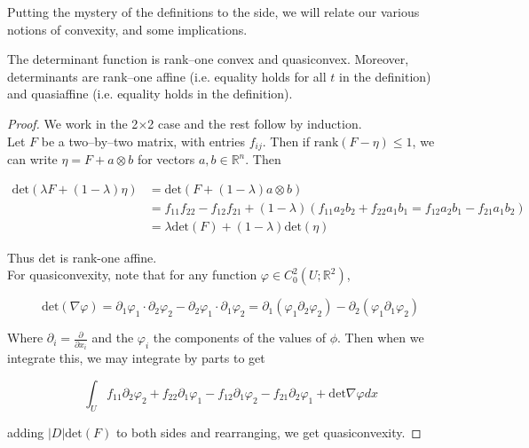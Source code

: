 \documentclass[../main.tex]{subfiles}
\begin{document}
Putting the mystery of the definitions to the side, we will relate our various notions of convexity, and some implications.

\begin{lem}
  The determinant function is rank--one convex and quasiconvex.
  Moreover, determinants are rank--one affine (i.e. equality holds for all $t$ in the definition) and quasiaffine (i.e. equality holds in the definition).
\end{lem}

\begin{proof}
  We work in the 2$\times$2 case and the rest follow by induction. \\

  Let $F$ be a two--by--two matrix, with entries $f_{ij}$.
  Then if $\mathrm{rank}(F - \eta) \leq 1$, we can write $\eta = F + a \otimes b$ for vectors $a,b \in \mathbb{R}^n$.
  Then
  
\begin{align*}
  \mathrm{det} ( \lambda F + (1- \lambda) \eta) &= \mathrm{det} ( F + (1-\lambda) a \otimes b) \\
                                 &= f_{11} f_{22} - f_{12}f_{21} + (1-\lambda) (f_{11} a_2b_2 + f_{22} a_1b_1 = f_{12} a_2b_1 - f_{21} a_1b_2) \\
  &= \lambda \mathrm{det}(F) + (1-\lambda) \mathrm{det} (\eta)
\end{align*}

Thus $\mathrm{det}$ is rank-one affine. \\

For quasiconvexity, note that for any function $\varphi \in C_0^2( U; \mathbb{R}^2)$,

\begin{equation*}
  \mathrm{det} ( \nabla \varphi) = \partial_1\varphi_1 \cdot \partial_2\varphi_2 - \partial_2\varphi_1 \cdot \partial_1 \varphi_2 = \partial_1 ( \varphi_1 \partial_2 \varphi_2) - \partial_2 ( \varphi_1 \partial_1 \varphi_2)
\end{equation*}

Where $\partial_i = \frac{\partial}{\partial x_i}$ and the $\varphi_i$ the components of the values of $\phi$.
Then when we integrate this, we may integrate by parts to get

\begin{equation*}
  \int_U f_{11} \partial_2 \varphi_2 + f_{22} \partial_1 \varphi_1 - f_{12} \partial_1 \varphi_2 - f_{21} \partial_2 \varphi_1 + \mathrm{det} \nabla \varphi dx
\end{equation*}

adding $\left| D \right| \mathrm{det} (F)$ to both sides and rearranging, we get quasiconvexity.

\end{proof}
\end{document}
